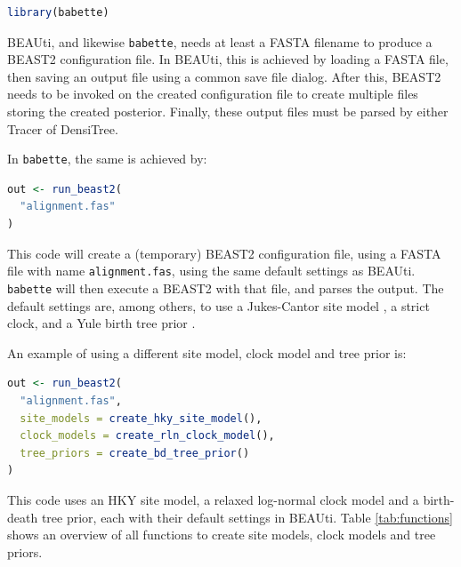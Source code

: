 \documentclass{article}
\begin{document}
\begin{lstlisting}[language=R, caption=Loading, label=lst:loading_babette, floatplacement=H]
library(babette)
\end{lstlisting}

BEAUti, and likewise \verb;babette;, needs at least a FASTA filename
to produce a BEAST2 configuration file. 
In BEAUti, this is achieved by loading a FASTA file, 
then saving an output file using a common
save file dialog. After this, BEAST2 needs to be invoked
on the created configuration file to create multiple files
storing the created posterior. Finally, these output
files must be parsed by either Tracer of DensiTree.

In \verb;babette;, the same is achieved by:

\begin{lstlisting}[language=R, caption=Simplest example, label=lst:simplest_example, floatplacement=H]
out <- run_beast2(
  "alignment.fas"
)
\end{lstlisting}

This code will create a (temporary) BEAST2 configuration file,
using a FASTA file with name \verb;alignment.fas;, using the same default settings as BEAUti.
\verb;babette; will then execute a BEAST2 with that file, and
parses the output. The default settings are, among others, 
to use a Jukes-Cantor site model \cite{cantor1969mammalian}, 
a strict clock, and a Yule birth tree prior \cite{yule}. 

An example of using a different site model, clock model 
and tree prior is:

\begin{lstlisting}[language=R, caption=Example with different site model and clock model and tree prior, label=lst:all_different, floatplacement=H]
out <- run_beast2(
  "alignment.fas",
  site_models = create_hky_site_model(),
  clock_models = create_rln_clock_model(),
  tree_priors = create_bd_tree_prior()
)
\end{lstlisting}

This code uses an HKY site model, a relaxed log-normal clock model and a 
birth-death tree prior, each with their default settings in BEAUti.
Table \ref{tab:functions} shows an overview of all functions to create site models, clock models and tree priors.
\end{document}
